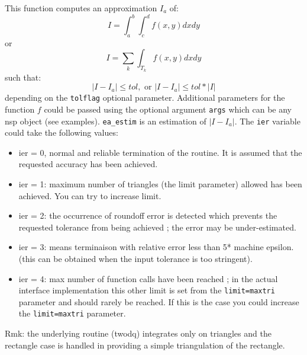 \begin{mandescription}
This function computes an approximation $I_a$ of:
$$
   I = \int_a^b \int_c^d f(x,y) dxdy
$$
or
$$
   I = \sum_k \int_{T_k} f(x,y) dxdy
$$
such that:
$$
   | I - I_a | \le  tol, \mbox{ or } | I - I_a | \le  tol*|I|
$$
depending on the \verb+tolflag+ optional parameter.
Additional parameters for the function $f$ could be passed using the
optional argument \verb+args+ which can be any nsp object (see
examples). \verb+ea_estim+ is an estimation of $| I - I_a |$. The
\verb+ier+ variable could take the following values: 
\begin{itemize}
\item ier = 0,  normal and reliable termination of the routine. It is assumed that the
      requested  accuracy has been achieved.
\item ier = 1: maximum number of triangles (the limit
      parameter) allowed has been achieved. You can try to
      increase limit.
\item ier = 2: the occurrence of roundoff error is detected
      which prevents the requested tolerance from being
      achieved ; the error may be under-estimated.
\item ier = 3: means terminaison with relative error less than 5* machine epsilon.
      (this can be obtained when the input tolerance is too stringent).
\item ier = 4: max number of function calls have been reached ;
      in the actual interface implementation this other limit is set
      from the \verb+limit=maxtri+ parameter and should rarely be
      reached. If this is the case you could increase the
      \verb+limit=maxtri+ parameter.
\end{itemize}

Rmk: the underlying routine (twodq) integrates only on triangles and
the rectangle case is handled in providing a simple triangulation of
the rectangle. 
\end{mandescription}

